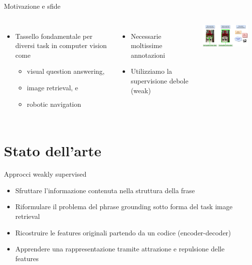 \documentclass{beamer}
\begin{document}
\begin{frame}{Motivazione e sfide}
  \begin{columns}
      \begin{itemize}
        \item Tassello fondamentale per diversi task in computer vision
        come 
        \begin{itemize} 
          \item \alert{visual question answering}, 
          \item \alert{image retrieval}, e 
          \item \alert{robotic navigation}
        \end{itemize}
      \end{itemize}
      \begin{itemize}
        \item Necessarie \alert{moltissime annotazioni}
        \item Utilizziamo la \alert{supervisione debole} (weak)
      \end{itemize}
      \vspace{0.5cm}
      \centering
      \includegraphics[width=5cm]{images/full-weak-no-supervision.png}
  \end{columns}
\end{frame}

\section{Stato dell'arte}

\begin{frame}{Approcci weakly supervised}
  \begin{itemize}
    \item Sfruttare l'informazione contenuta nella \alert{struttura
    della frase}
    \item Riformulare il problema del phrase grounding sotto forma del
    task \alert{image retrieval}
    \item \alert{Ricostruire} le features originali partendo da un
    codice (encoder-decoder)
    \item Apprendere una rappresentazione tramite
    \alert{attrazione e repulsione} delle features
  \end{itemize}
\end{frame}
\end{document}

